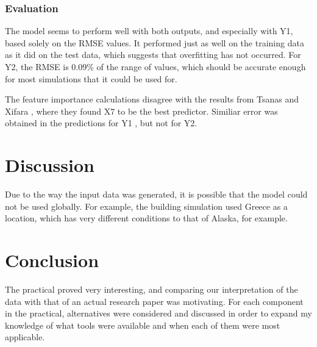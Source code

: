 \documentclass[12pt]{article}
\begin{document}
\section{Evaluation}

The model seems to perform well with both outputs, and especially with Y1, based solely on the RMSE values. It performed just as well on the training data as it did on the test data, which suggests that overfitting has not occurred. For Y2, the RMSE is 0.09\% of the range of values, which should be accurate enough for most simulations that it could be used for. 

The feature importance calculations disagree with the results from Tsanas and Xifara \cite{tsanas_xifara_2012}, where they found X7 to be the best predictor. Similiar error was obtained in the predictions for Y1 , but not for Y2. 

\part{Discussion}

Due to the way the input data was generated, it is possible that the model could not be used globally. For example, the building simulation used Greece as a location, which has very different conditions to that of Alaska, for example. 

\part{Conclusion}

The practical proved very interesting, and comparing our interpretation of the data with that of an actual research paper was motivating. For each component in the practical, alternatives were considered and discussed in order to expand my knowledge of what tools were available and when each of them were most applicable. 

\pagebreak



\end{document}
